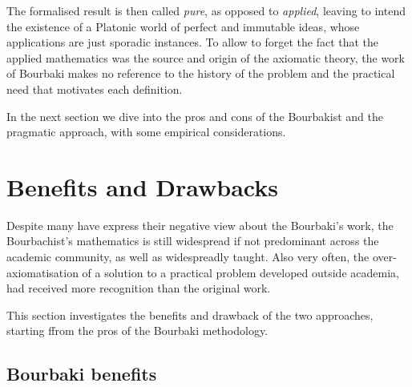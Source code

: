\documentclass[]{scrartcl}
\theoremstyle{definition}
\begin{document}
The formalised result is then called \emph{pure}, as opposed to \emph{applied}, leaving to intend the existence of a Platonic world of perfect and immutable ideas, whose applications are just sporadic instances. To allow to forget the fact that the applied mathematics was the source and origin of the axiomatic theory, the work of Bourbaki makes no reference to the history of the problem and the practical need that motivates each definition.



In the next section we dive into the pros and cons of the Bourbakist and the pragmatic approach, with some empirical considerations.

\section{Benefits and Drawbacks}


Despite many have express their negative view about the Bourbaki's work, the Bourbachist's mathematics is still widespread if not predominant across the academic community, as well as widespreadly taught.
Also very often, the over-axiomatisation of a solution to a practical problem developed outside academia, had received more recognition than the original work.

This section investigates the benefits and drawback of the two approaches, starting ffrom the pros of the Bourbaki methodology.

\subsection*{Bourbaki benefits}
\end{document}
